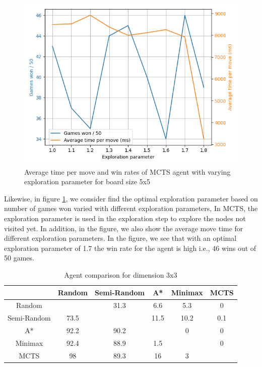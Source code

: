 \begin{figure}[!ht]
    \centering
    \includegraphics[width=0.7\linewidth]{../img/mcts_exploration_param_grid_search.png}
    \caption{Average time per move and win rates of MCTS agent with varying exploration parameter for board size 5x5}
    \label{fig:mcts_exp_simulations}
\end{figure}

Likewise, in figure \ref{fig:mcts_exp_simulations}, we consider find the optimal exploration parameter based on number of games won varied with different exploration parameters, In \gls{MCTS}, the exploration parameter is used in the exploration step to explore the nodes not visited yet. In addition, in the figure, we also show the average move time for different exploration parameters. In the figure, we see that with an optimal exploration parameter of 1.7 the win rate for the agent is high i.e., 46 wins out of 50 games.

\begin{table}[!ht]
    \centering
     \begin{tabular}{|c|c|c|c|c|c|}\hline
                & Random & Semi-Random & A*  & Minimax & MCTS \\ \hline 
    Random      &        &    31.3     & 6.6 &   5.3   &  0   \\ \hline
    Semi-Random &   73.5 &             & 11.5&   10.2  & 0.1  \\ \hline
    A*          &   92.2 &    90.2     &     &   0     &  0   \\ \hline
    Minimax     &   92.4 &    88.9     & 1.5 &         &  0   \\ \hline
    MCTS        &   98   &    89.3     &  16 &   3     &      \\ \hline
     \end{tabular}
     \caption{Agent comparison for dimension 3x3}
     \label{tab:agent_eval_3x3}
 \end{table}

